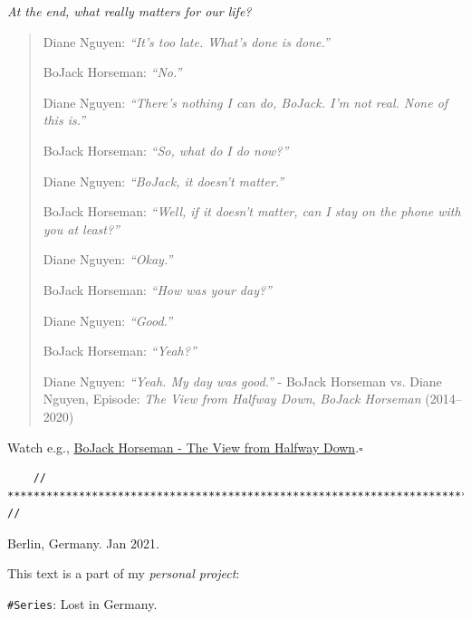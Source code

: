 \documentclass[12pt]{article}
\begin{document}
{\it At the end, what really matters for our life?}
\begin{quotation}
	Diane Nguyen: {\it ``It's too late. What's done is done.''}
	
	BoJack Horseman: {\it ``No.''}
	
	Diane Nguyen: {\it ``There's nothing I can do, BoJack. I'm not real. None of this is.''}
	
	BoJack Horseman: {\it ``So, what do I do now?''}
	
	Diane Nguyen: {\it ``BoJack, it doesn't matter.''}
	
	BoJack Horseman: {\it ``Well, if it doesn't matter, can I stay on the phone with you at least?''}
	
	Diane Nguyen: {\it ``Okay.''}
	
	BoJack Horseman: {\it ``How was your day?''}
	
	Diane Nguyen: {\it ``Good.''}
	
	BoJack Horseman: {\it ``Yeah?''}
	
	Diane Nguyen: {\it ``Yeah. My day was good.''} - BoJack Horseman vs. Diane Nguyen,  Episode: {\it The View from Halfway Down}, {\it BoJack Horseman} (2014--2020)
\end{quotation}
Watch e.g., \href{https://www.youtube.com/watch?v=Pt21dU5Pu8g}{BoJack Horseman - The View from Halfway Down}.\hfill$\square$

\begin{verbatim}
	// ************************************************************************* //
\end{verbatim}

\begin{flushright}
	{\sc Berlin, Germany}. Jan 2021.
	
	This text is a part of my {\it personal project}: 
	
	{\tt \#Series}: {\sc Lost in Germany}.
\end{flushright}
\end{document}
